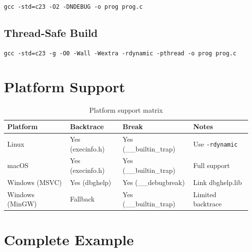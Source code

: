\documentclass[11pt,a4paper]{article}
\begin{document}
\begin{verbatim}
gcc -std=c23 -O2 -DNDEBUG -o prog prog.c
\end{verbatim}

\subsection{Thread-Safe Build}

\begin{verbatim}
gcc -std=c23 -g -O0 -Wall -Wextra -rdynamic -pthread -o prog prog.c
\end{verbatim}

\section{Platform Support}

\begin{table}[h]
\centering
\begin{tabular}{@{}llll@{}}
\toprule
\textbf{Platform} & \textbf{Backtrace} & \textbf{Break} & \textbf{Notes} \\
\midrule
Linux & Yes (execinfo.h) & Yes (\_\_builtin\_trap) & Use \texttt{-rdynamic} \\
macOS & Yes (execinfo.h) & Yes (\_\_builtin\_trap) & Full support \\
Windows (MSVC) & Yes (dbghelp) & Yes (\_\_debugbreak) & Link dbghelp.lib \\
Windows (MinGW) & Fallback & Yes (\_\_builtin\_trap) & Limited backtrace \\
\bottomrule
\end{tabular}
\caption{Platform support matrix}
\end{table}

\section{Complete Example}
\end{document}
